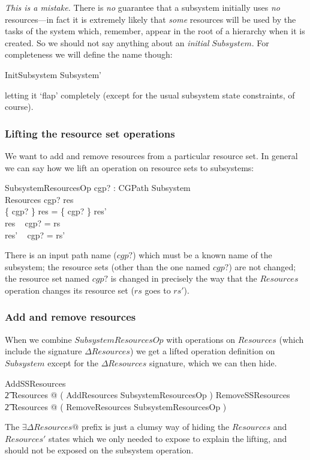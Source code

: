 \documentclass[a4paper,twoside,12pt]{article}
\begin{document}
\emph{This is a mistake.}
There is \emph{no} guarantee that a subsystem initially uses \emph{no} resources---in fact it is
extremely likely that \emph{some} resources will be used by the tasks of the system which, remember, appear in the
root of a hierarchy when
it is created. So we should not say anything about an \emph{initial} $Subsystem$.
For completeness we will define the name though:
\begin{zed}
InitSubsystem  Subsystem'
\end{zed}
letting it `flap' completely (except for the usual subsystem state constraints, of course).

\subsubsection{Lifting the resource set operations}
We want to add and remove resources from a particular resource set. In general we can say
how we lift an operation on resource sets to subsystems:

\begin{schema}{SubsystemResourcesOp}
cgp? : CGPath
\also
\Delta Subsystem \\
\Delta Resources
\where
cgp? \in \dom res \\
\{ cgp? \} \ndres res = \{ cgp? \} \ndres res' \\
res ~ cgp? = rs \\
res' ~ cgp? = rs'
\end{schema}
There is an input path name ($cgp?$) which must be a known name of the subsystem;
the resource sets (other than the one named $cgp?$) are not changed;
the resource set named $cgp?$ is changed in precisely the way that the $Resources$ operation changes
its resource set ($rs$ goes to $rs'$).

\subsubsection{Add and remove resources}
When we combine $SubsystemResourcesOp$ with operations on $Resources$
(which include the signature $\Delta Resources$)
we get a lifted operation definition on $Subsystem$ except for the $\Delta Resources$ signature,
which we can then hide.

\begin{zed}
AddSSResources  \\
\t2 \exists \Delta Resources @ ( AddResources \land SubsystemResourcesOp )
\also
RemoveSSResources  \\
\t2 \exists \Delta Resources @ ( RemoveResources \land SubsystemResourcesOp )
\end{zed}
The $\exists \Delta Resources @$ prefix is just a clumsy way of hiding the $Resources$ and $Resources'$ states
which we only needed to expose to explain the lifting, and should not be exposed on the
subsystem operation.
\end{document}
